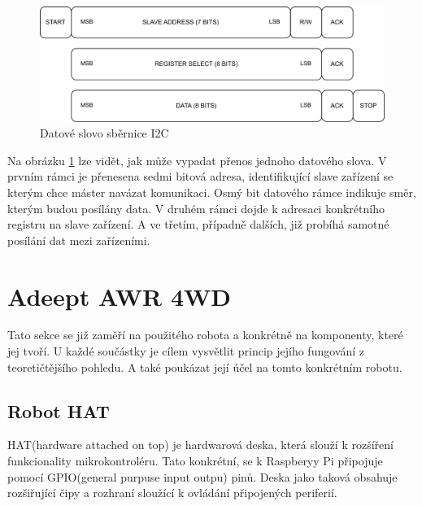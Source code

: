 \begin{figure}[h!]
	\centering
	\includegraphics[scale=0.75]{obrazky-figures/i2c_data_word.pdf}
	\caption{Datové slovo sběrnice I2C}
	\label{fig:i2c_word}
\end{figure}

Na obrázku \ref{fig:i2c_word} lze vidět, jak může vypadat přenos jednoho datového slova. V prvním rámci je přenesena sedmi bitová adresa, identifikující slave zařízení se kterým chce máster navázat komunikaci. Osmý bit datového rámce indikuje směr, kterým budou posílány data. V druhém rámci dojde k adresaci konkrétního registru na slave zařízení. A ve třetím, případně dalších, již probíhá samotné posílání dat mezi zařízeními. \cite[str:~3, 5]{an4481}

\section{Adeept AWR 4WD}
Tato sekce se již zaměří na použitého robota a konkrétně na komponenty, které jej tvoří. U každé součástky je cílem vysvětlit princip jejího fungování z teoretičtějšího pohledu. A také poukázat její účel na tomto konkrétním robotu.

\subsection*{Robot HAT}
HAT(hardware attached on top) je hardwarová deska, která slouží k rozšíření funkcionality mikrokontroléru. Tato konkrétní, se k Raspberyy Pi připojuje pomocí GPIO(general purpuse input outpu) pinů. Deska jako taková obsahuje rozšiřující čipy a rozhraní sloužící k ovládání připojených periferií.

